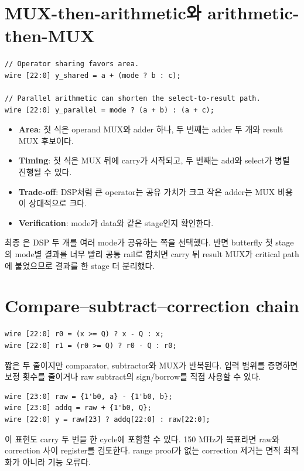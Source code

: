 \section{MUX-then-arithmetic와 arithmetic-then-MUX}

\begin{lstlisting}
// Operator sharing favors area.
wire [22:0] y_shared = a + (mode ? b : c);

// Parallel arithmetic can shorten the select-to-result path.
wire [22:0] y_parallel = mode ? (a + b) : (a + c);
\end{lstlisting}

\begin{itemize}
  \item \textbf{Area}: 첫 식은 operand MUX와 adder 하나, 두 번째는 adder 두 개와 result MUX 후보이다.
  \item \textbf{Timing}: 첫 식은 MUX 뒤에 carry가 시작되고, 두 번째는 add와 select가 병렬 진행될 수 있다.
  \item \textbf{Trade-off}: DSP처럼 큰 operator는 공유 가치가 크고 작은 adder는 MUX 비용이 상대적으로 크다.
  \item \textbf{Verification}: mode가 data와 같은 stage인지 확인한다.
\end{itemize}

최종 은 DSP 두 개를 여러 mode가 공유하는 쪽을 선택했다. 반면
butterfly 첫 stage의 mode별 결과를 너무 빨리 공통 rail로 합치면 carry 뒤 result
MUX가 critical path에 붙었으므로 결과를 한 stage 더 분리했다.

\section{Compare--subtract--correction chain}

\begin{lstlisting}
wire [22:0] r0 = (x >= Q) ? x - Q : x;
wire [22:0] r1 = (r0 >= Q) ? r0 - Q : r0;
\end{lstlisting}

짧은 두 줄이지만 comparator, subtractor와 MUX가 반복된다. 입력 범위를 증명하면
보정 횟수를 줄이거나 raw subtract의 sign/borrow를 직접 사용할 수 있다.

\begin{lstlisting}
wire [23:0] raw = {1'b0, a} - {1'b0, b};
wire [23:0] addq = raw + {1'b0, Q};
wire [22:0] y = raw[23] ? addq[22:0] : raw[22:0];
\end{lstlisting}

이 표현도 carry 두 번을 한 cycle에 포함할 수 있다. 150 MHz가 목표라면 raw와
correction 사이 register를 검토한다. range proof가 없는 correction 제거는
면적 최적화가 아니라 기능 오류다.

